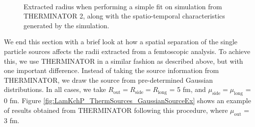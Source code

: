 \documentclass[/home/jesse/Analysis/FemtoAnalysis/AnalysisNotes/AnalysisNoteJBuxton.tex]{subfiles}
\begin{document}
\begin{figure}[h!]
  \centering
   \\
  \caption[Extracted radius with pair sources from THERMINATOR 2]{Extracted radius when performing a simple fit on simulation from THERMINATOR 2, along with the spatio-temporal characteristics generated by the simulation.}
  \label{fig:LamKchP_StdThermSources}
\end{figure}




We end this section with a brief look at how a spatial separation of the single particle sources affects the radii extracted from a femtoscopic analysis.
To achieve this, we use THERMINATOR in a similar fashion as described above, but with one important difference.
Instead of taking the source information from THERMINATOR, we draw the source from pre-determined Gaussian distributions.
In all cases, we take $R_{\mathrm{out}} = R_{\mathrm{side}} = R_{\mathrm{long}}$ = 5 fm, and $\mu_{\mathrm{side}} = \mu_{\mathrm{long}}$ = 0 fm.
Figure \ref{fig:LamKchP_ThermSources_GaussianSourceEx} shows an example of results obtained from THERMINATOR following this procedure, where $\mu_{\mathrm{out}}$ = 3 fm.
\end{document}
